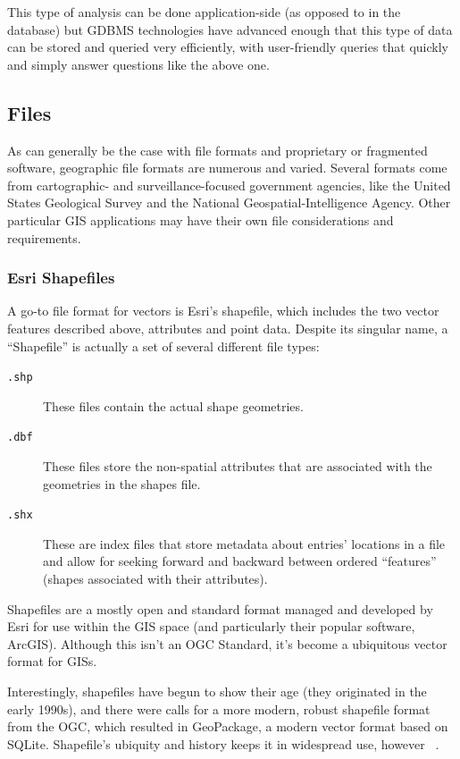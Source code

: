 This type of analysis can be done application-side (as opposed to in the database) but GDBMS technologies have advanced enough that this type of data can be stored and queried very efficiently, with user-friendly queries that quickly and simply answer questions like the above one.

\subsection{Files}
\label{background_formats}
As can generally be the case with file formats and proprietary or fragmented software, geographic file formats are numerous and varied. Several formats come from cartographic- and surveillance-focused government agencies, like the United States Geological Survey and the National Geospatial-Intelligence Agency. Other particular GIS applications may have their own file considerations and requirements.

\subsubsection{Esri Shapefiles}
A go-to file format for vectors is Esri's shapefile, which includes the two vector features described above, attributes and point data. Despite its singular name, a ``Shapefile'' is actually a set of several different file types:

\begin{description}
  \item[\tt{.shp}] These files contain the actual shape geometries.
  \item[\tt{.dbf}] These files store the non-spatial attributes that are associated with the geometries in the shapes file.
  \item[\tt{.shx}] These are index files that store metadata about entries' locations in a file and allow for seeking forward and backward between ordered ``features'' (shapes associated with their attributes).
\end{description}

Shapefiles are a mostly open and standard format managed and developed by Esri for use within the GIS space (and particularly their popular software, ArcGIS). Although this isn't an OGC Standard, it's become a ubiquitous vector format for GISs.

Interestingly, shapefiles have begun to show their age (they originated in the early 1990s), and there were calls for a more modern, robust shapefile format from the OGC, which resulted in GeoPackage, a modern vector format based on SQLite. Shapefile's ubiquity and history keeps it in widespread use, however ~\cite{slashgeo,GeoPackage}.

